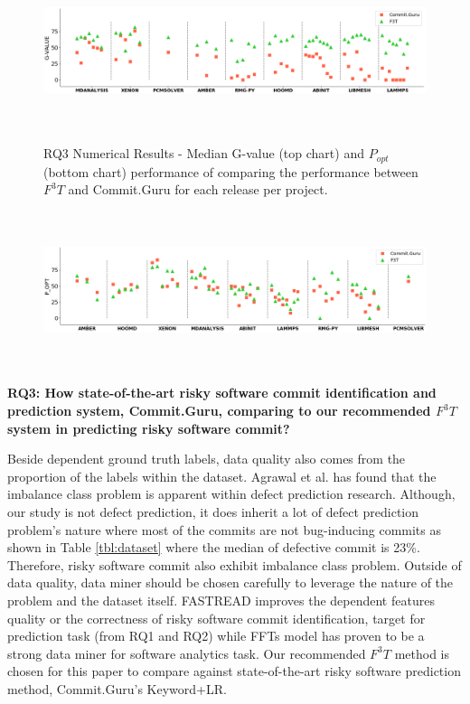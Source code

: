 \documentclass[10pt,conference]{IEEEtran}
\begin{document}
\begin{figure}[!t]
\caption{RQ3 Numerical Results - Median G-value (top chart) and $P_{opt}$ (bottom chart) performance of comparing the performance between $F^3T$ and Commit.Guru for each release per project.}
\includegraphics[width=\linewidth, height=1.8in]{rq3_1.png}
\label{fig:rq3}
\vspace{-20pt}
\end{figure}
\begin{figure}[!t]
\includegraphics[width=\linewidth, height=1.8in]{rq3_2.png}
\vspace{-20pt}
\end{figure}

\textbf{RQ3: {How state-of-the-art risky software commit identification and prediction system, Commit.Guru, comparing to our recommended $F^3T$ system in predicting risky software commit?}}
 
Beside dependent ground truth labels, data quality also comes from the proportion of the labels within the dataset. Agrawal et al. \cite{agrawal2018better} has found that the imbalance class problem is apparent within defect prediction research. Although, our study is not defect prediction, it does inherit a lot of defect prediction problem's nature where most of the commits are not bug-inducing commits as shown in Table \ref{tbl:dataset} where the median of defective commit is 23\%. Therefore, risky software commit also exhibit imbalance class problem. Outside of data quality, data miner should be chosen carefully to leverage the nature of the problem and the dataset itself. FASTREAD improves the dependent features quality or the correctness of risky software commit identification, target for prediction task (from RQ1 and RQ2) while FFTs model has proven to be a strong data miner for software analytics task. Our recommended $F^3T$ method is chosen for this paper to compare against state-of-the-art risky software prediction method, Commit.Guru's Keyword+LR. 
\end{document}
